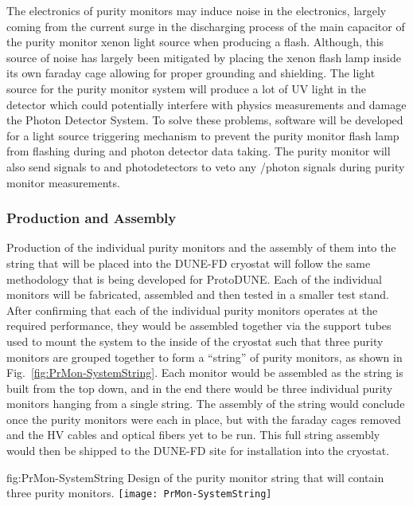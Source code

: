 The electronics of purity monitors may induce noise in the  electronics, largely coming from the current surge in the discharging process of the main capacitor of the purity monitor xenon light source when producing a flash.  Although, this source of noise has largely been mitigated by placing the xenon flash lamp inside its own faraday cage allowing for proper grounding and shielding.  The light source for the purity monitor system will produce a lot of UV light in the detector which could potentially interfere with physics measurements and damage the Photon Detector System. To solve these problems, software will be developed for a light source triggering mechanism to prevent the purity monitor flash lamp from flashing during  and photon detector data taking. The purity monitor will also send signals to  and photodetectors to veto any /photon signals during purity monitor measurements. 


\subsubsection{Production and Assembly}
\label{sec:PrMon-Production-Assembly}
Production of the individual purity monitors and the assembly of them into the string that will be placed into the DUNE-FD cryostat will follow the same methodology that is being developed for ProtoDUNE.  Each of the individual monitors will be fabricated, assembled and then tested in a smaller test stand.  After confirming that each of the individual purity monitors operates at the required performance, they would be assembled together via the support tubes used to mount the system to the inside of the cryostat such that three purity monitors are grouped together to form a ``string'' of purity monitors, as shown in Fig.~\ref{fig:PrMon-SystemString}.
Each monitor would be assembled as the string is built from the top down, and in the end there would be three individual purity monitors hanging from a single string.  The assembly of the string would conclude once the purity monitors were each in place, but with the faraday cages removed and the HV cables and optical fibers yet to be run.  This full string assembly would then be shipped to the DUNE-FD site for installation into the cryostat.

\begin{dunefigure}{fig:PrMon-SystemString}
  {Design of the purity monitor string that will contain three purity monitors.}
  \texttt{[image: PrMon-SystemString]}
\end{dunefigure}




